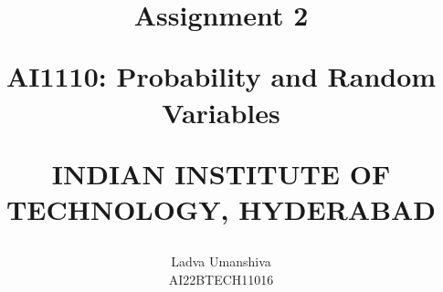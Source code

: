 \documentclass[journal,12pt,twocolumn]{IEEEtran}
\begin{document}
\let\vec\mathbf




\vspace{3cm}

\title{
	\textbf{Assignment 2}

	\Large \textbf{AI1110}: Probability and Random Variables

	INDIAN INSTITUTE OF TECHNOLOGY, HYDERABAD
}
\author{
	Ladva Umanshiva

	AI22BTECH11016
}

\maketitle

\newpage
\end{document}

